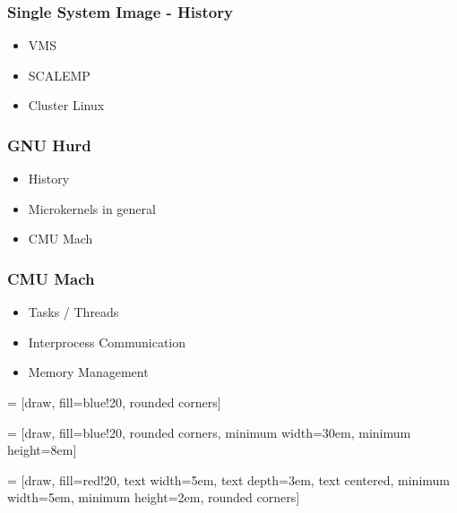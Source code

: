 \documentclass{beamer}
\begin{document}
\begin{frame}
\frametitle{Single System Image - History}
\begin{itemize}
\item VMS
\item SCALEMP
\item Cluster Linux
\end{itemize}
\end{frame}

\begin{frame}
\frametitle{GNU Hurd}
\begin{itemize}
\item History
\item Microkernels in general
\item CMU Mach
\end{itemize}
\end{frame}

\begin{frame}
\frametitle{CMU Mach}
\begin{itemize}
\item Tasks / Threads
\item Interprocess Communication
\item Memory Management
\end{itemize}
\end{frame}


 = [draw, fill=blue!20, rounded corners]

 = [draw, fill=blue!20, rounded corners, minimum width=30em, minimum height=8em]

 = [draw, fill=red!20, text width=5em, text depth=3em, text centered,
  minimum width=5em, minimum height=2em, rounded corners]

%
\end{document}

